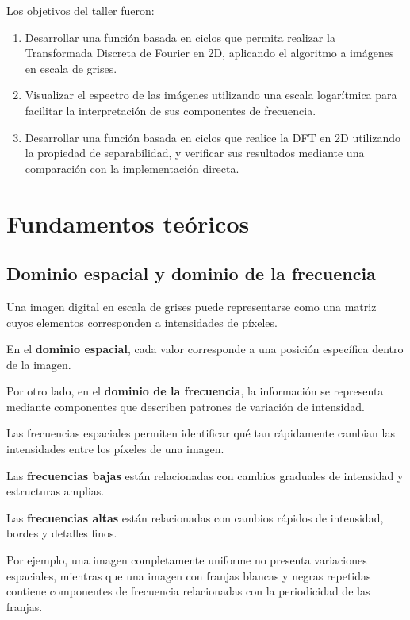 \documentclass[11pt,letterpaper]{article}
\begin{document}
Los objetivos del taller fueron:

\begin{enumerate}

    \item Desarrollar una función basada en ciclos que
    permita realizar la Transformada Discreta de Fourier
    en 2D, aplicando el algoritmo a imágenes en escala
    de grises.

    \item Visualizar el espectro de las imágenes utilizando
    una escala logarítmica para facilitar la interpretación
    de sus componentes de frecuencia.

    \item Desarrollar una función basada en ciclos que
    realice la DFT en 2D utilizando la propiedad de
    separabilidad, y verificar sus resultados mediante
    una comparación con la implementación directa.

\end{enumerate}

\section{Fundamentos teóricos}

\subsection{Dominio espacial y dominio de la frecuencia}

Una imagen digital en escala de grises puede representarse
como una matriz cuyos elementos corresponden a intensidades
de píxeles.

En el \textbf{dominio espacial}, cada valor corresponde
a una posición específica dentro de la imagen.

Por otro lado, en el \textbf{dominio de la frecuencia},
la información se representa mediante componentes que
describen patrones de variación de intensidad.

Las frecuencias espaciales permiten identificar qué tan
rápidamente cambian las intensidades entre los píxeles
de una imagen.

Las \textbf{frecuencias bajas} están relacionadas
con cambios graduales de intensidad y estructuras
amplias.

Las \textbf{frecuencias altas} están relacionadas
con cambios rápidos de intensidad, bordes y detalles
finos.

Por ejemplo, una imagen completamente uniforme no
presenta variaciones espaciales, mientras que una imagen
con franjas blancas y negras repetidas contiene
componentes de frecuencia relacionadas con la
periodicidad de las franjas.
\end{document}
